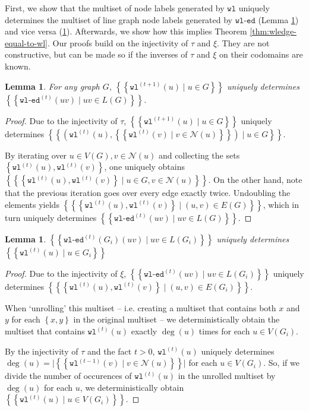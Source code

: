 \documentclass{article}
\newtheorem{lemma}[theorem]{Lemma}
\newcommand{\set}[1]{\left\{#1\right\}}
\newcommand{\multiset}[1]{\left\{\!\!\left\{#1\right\}\!\!\right\}}
\newcommand{\iter}[1]{^{(#1)}}
\newcommand{\wl}{\texttt{wl}}
\newcommand{\wledge}{\texttt{wl-ed}}
\newcommand{\dec}{\xi}
\newcommand{\hash}{\tau}
\newcommand{\nbh}{\mathcal{N}}
\begin{document}

First, we show that the multiset of node labels generated by $\wl$ uniquely determines the multiset of line graph node labels generated by $\wledge$ (Lemma \ref{lemma:wl-determines-wledge}) and vice versa (\ref{lemma:wledge-determines-wl}). Afterwards, we show how this implies Theorem \ref{thm:wledge-equal-to-wl}. Our proofs build on the injectivity of $\hash$ and $\dec$. They are not constructive, but can be made so if the inverses of $\hash$ and $\dec$ on their codomains are known.



\begin{lemma}   \label{lemma:wl-determines-wledge}
    For any graph $G$, $\multiset{\wl\iter{t+1}(u) \mid u\in G}$ uniquely determines $\multiset{\wledge\iter{t}(uv) \mid uv\in L(G)}$.
\end{lemma}
\begin{proof}
    Due to the injectivity of $\hash$,
    $\multiset{\wl\iter{t+1}(u) \mid u\in G}$
    uniquely determines
    $\multiset{\left(
        \wl\iter{t}(u),
        \multiset{\wl\iter{t}(v) \mid v\in \nbh(u)}
    \right) \mid u\in G}$.

    By iterating over $u\in V(G), v\in\nbh(u)$ and collecting the sets $\set{\wl\iter{t}(u), \wl\iter{t}(v)}$, one uniquely obtains $\multiset{\set{\wl\iter{t}(u), \wl\iter{t}(v)} \mid u\in G, v\in\nbh(u)}$.
    On the other hand, note that the previous iteration goes over every edge exactly twice. Undoubling the elements yields $\multiset{\set{\wl\iter{t}(u), \wl\iter{t}(v)} \mid (u,v)\in E(G)}$, which in turn uniquely determines $\multiset{\wledge\iter{t}(uv) \mid uv\in L(G)}$.

\end{proof}

\begin{lemma}   \label{lemma:wledge-determines-wl}
    $\multiset{\wledge\iter{t}(G_i)(uv) \mid uv\in L(G_i)}$ uniquely determines $\multiset{\wl\iter{t}(u) \mid u\in G_i}$
\end{lemma}
\begin{proof}
    Due to the injectivity of $\dec$,
    $\multiset{\wledge\iter{t}(uv) \mid uv\in L(G_i)}$
    uniquely determines
    $\multiset{\set{\wl\iter{t}(u), \wl\iter{t}(v)} \mid (u,v)\in E(G_i)}$.

    When `unrolling' this multiset -- i.e. creating a multiset that contains both $x$ and $y$ for each $\set{x,y}$ in the original multiset -- we deterministically obtain the multiset that contains $\wl\iter{t}(u)$ exactly $\deg(u)$ times for each $u\in V(G_i)$.

    By the injectivity of $\hash$ and the fact $t>0$, $\wl\iter{t}(u)$ uniquely determines $\deg(u) = \lvert\multiset{\wl\iter{t-1}(v) \mid v\in \nbh(u)}\rvert$ for each $u\in V(G_i)$. So, if we divide the number of occurences of $\wl\iter{t}(u)$ in the unrolled multiset by $\deg(u)$ for each $u$, we deterministically obtain $\multiset{\wl\iter{t}(u) \mid u\in V(G_i)}$.
\end{proof}
\end{document}
